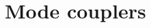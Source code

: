 \section{Mode couplers}

\begin{example}
	
\end{example}
\begin{example}
	
\end{example}
\begin{example}
	
\end{example}